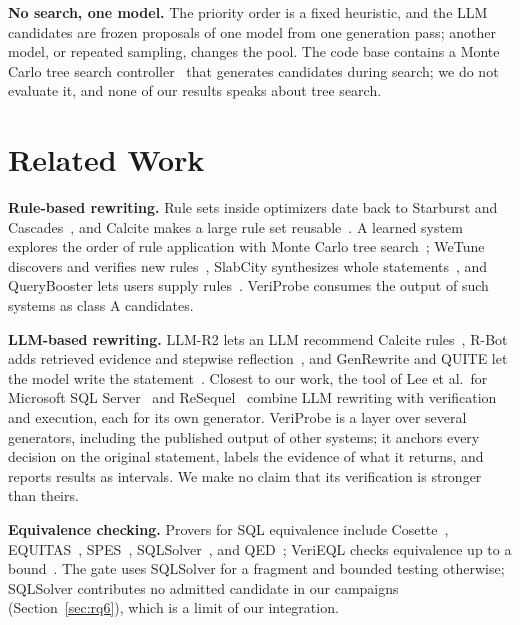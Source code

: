 \documentclass[conference]{IEEEtran}
\newcommand{\sys}{VeriProbe}
\begin{document}
\textbf{No search, one model.}
The priority order is a fixed heuristic, and the LLM candidates are frozen proposals of one model from one generation pass; another model, or repeated sampling, changes the pool.
The code base contains a Monte Carlo tree search controller~\cite{kocsis2006} that generates candidates during search; we do not evaluate it, and none of our results speaks about tree search.

\section{Related Work}
\label{sec:related}

\textbf{Rule-based rewriting.}
Rule sets inside optimizers date back to Starburst and Cascades~\cite{pirahesh1992,graefe1995}, and Calcite makes a large rule set reusable~\cite{begoli2018}.
A learned system explores the order of rule application with Monte Carlo tree search~\cite{zhou2021}; WeTune discovers and verifies new rules~\cite{wang2022}, SlabCity synthesizes whole statements~\cite{dong2023}, and QueryBooster lets users supply rules~\cite{bai2023}.
\sys{} consumes the output of such systems as class A candidates.

\textbf{LLM-based rewriting.}
LLM-R2 lets an LLM recommend Calcite rules~\cite{li2024}, R-Bot adds retrieved evidence and stepwise reflection~\cite{sun2025}, and GenRewrite and QUITE let the model write the statement~\cite{liu2026,song2025}.
Closest to our work, the tool of Lee et al.\ for Microsoft SQL Server~\cite{lee2026} and ReSequel~\cite{fathollahzadeh2026} combine LLM rewriting with verification and execution, each for its own generator.
\sys{} is a layer over several generators, including the published output of other systems; it anchors every decision on the original statement, labels the evidence of what it returns, and reports results as intervals.
We make no claim that its verification is stronger than theirs.

\textbf{Equivalence checking.}
Provers for SQL equivalence include Cosette~\cite{chu2017}, EQUITAS~\cite{zhou2019}, SPES~\cite{zhou2022}, SQLSolver~\cite{ding2023}, and QED~\cite{wang2024}; VeriEQL checks equivalence up to a bound~\cite{he2024}.
The gate uses SQLSolver for a fragment and bounded testing otherwise; SQLSolver contributes no admitted candidate in our campaigns (Section~\ref{sec:rq6}), which is a limit of our integration.

\end{document}
